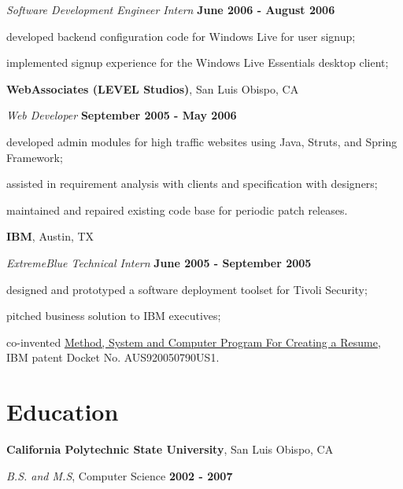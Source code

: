 \documentclass[margin,line]{res}
\newenvironment{list1}{
  \begin{list}{\ding{113}}{%
      \setlength{\itemsep}{0in}
      \setlength{\parsep}{0in} \setlength{\parskip}{0in}
      \setlength{\topsep}{0in} \setlength{\partopsep}{0in} 
      \setlength{\leftmargin}{0.17in}}}{\end{list}}
\begin{document}
\begin{resume}
\vspace{-.3cm}
{\em Software Development Engineer Intern} \hfill {\small \bf June 2006 - August 2006}
\begin{list1}
\item[] developed backend configuration code for Windows Live for user signup;
\item[] implemented signup experience for the Windows Live Essentials desktop client;
\end{list1}

{\bf WebAssociates (LEVEL Studios)}, San Luis Obispo, CA

\vspace{-.3cm}
{\em Web Developer} \hfill {\small \bf September 2005 - May 2006}
\begin{list1}
\item[] developed admin modules for high traffic websites using Java, Struts, and Spring Framework;
\item[] assisted in requirement analysis with clients and specification with designers;
\item[] maintained and repaired existing code base for periodic patch releases.
\end{list1}

{\bf IBM}, Austin, TX

\vspace{-.3cm}
{\em ExtremeBlue Technical Intern} \hfill {\small \bf June 2005 - September 2005}
\begin{list1}
\item[] designed and prototyped a software deployment toolset for Tivoli Security;
\item[] pitched business solution to IBM executives;
\item[] co-invented \href{http://www.google.com/patents/about?id=_yChAAAAEBAJ}{\sc Method, System and Computer Program For Creating a Resume}, IBM patent Docket No. AUS920050790US1.
\end{list1}	

\section{\sc \large Education}
{\bf California Polytechnic State University}, San Luis Obispo, CA

\vspace{-.3cm}
{\em B.S. and M.S}, Computer Science \hfill {\small \bf 2002 - 2007}
\begin{list1}
\item[] 
\end{list1}


\end{resume}
\end{document}
